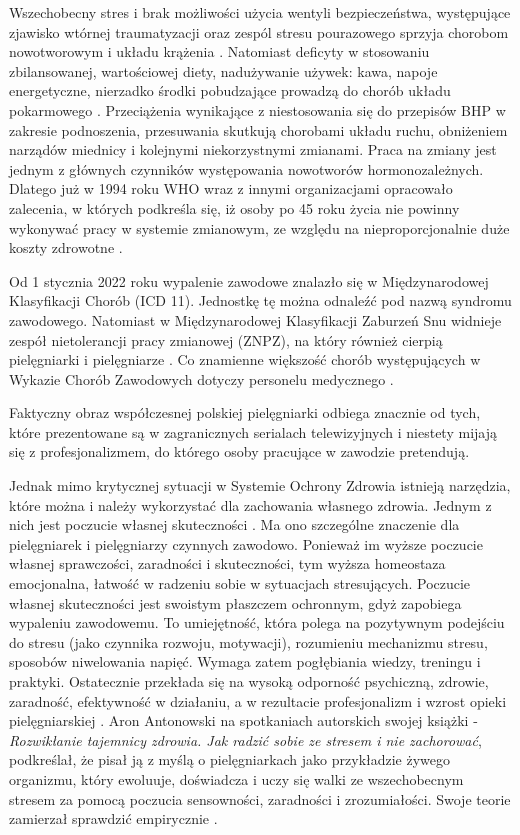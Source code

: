 \documentclass[a4paper,12pt,twoside,openright]{mwrep}
\begin{document}
Wszechobecny stres i brak możliwości użycia wentyli bezpieczeństwa, występujące zjawisko wtórnej traumatyzacji oraz zespól stresu pourazowego sprzyja chorobom nowotworowym i układu krążenia \cite{skutki}. Natomiast deficyty w stosowaniu zbilansowanej, wartościowej diety, nadużywanie używek: kawa, napoje energetyczne, nierzadko środki pobudzające prowadzą do chorób układu pokarmowego \cite{p.p}. Przeciążenia wynikające z niestosowania się do przepisów BHP w zakresie podnoszenia, przesuwania skutkują chorobami układu ruchu, obniżeniem narządów miednicy i kolejnymi niekorzystnymi zmianami. Praca na zmiany jest jednym z głównych czynników występowania nowotworów hormonozależnych. Dlatego już w 1994 roku WHO wraz z innymi organizacjami opracowało zalecenia, w których podkreśla się, iż osoby po 45 roku życia nie powinny wykonywać pracy w systemie zmianowym, ze względu na nieproporcjonalnie duże koszty zdrowotne  \cite{zalecenia}. 

Od 1 stycznia 2022 roku wypalenie zawodowe znalazło się w Międzynarodowej Klasyfikacji Chorób (ICD 11). Jednostkę tę można odnaleźć pod nazwą syndromu zawodowego. Natomiast w Międzynarodowej Klasyfikacji Zaburzeń Snu widnieje zespół nietolerancji pracy zmianowej (ZNPZ), na który również cierpią pielęgniarki i pielęgniarze \cite{znpz}. Co znamienne większość chorób występujących w Wykazie Chorób Zawodowych dotyczy personelu medycznego \cite{wykaz}. 


 Faktyczny obraz współczesnej polskiej pielęgniarki odbiega znacznie od tych, które prezentowane są w zagranicznych serialach telewizyjnych i niestety mijają się z profesjonalizmem, do którego osoby pracujące w zawodzie pretendują.

Jednak mimo krytycznej sytuacji w Systemie Ochrony Zdrowia istnieją narzędzia, które można i należy wykorzystać dla zachowania własnego zdrowia. Jednym z nich jest poczucie własnej skuteczności \cite{skutecznosc}. Ma ono szczególne znaczenie dla pielęgniarek i pielęgniarzy czynnych zawodowo. Ponieważ im wyższe poczucie własnej sprawczości, zaradności i skuteczności, tym wyższa homeostaza emocjonalna, łatwość w radzeniu sobie w sytuacjach stresujących. Poczucie własnej skuteczności jest swoistym płaszczem ochronnym, gdyż zapobiega wypaleniu zawodowemu. To umiejętność, która polega na pozytywnym podejściu do stresu (jako czynnika rozwoju, motywacji), rozumieniu mechanizmu stresu, sposobów niwelowania napięć. Wymaga zatem pogłębiania wiedzy, treningu i praktyki. Ostatecznie przekłada się na wysoką odporność psychiczną, zdrowie, zaradność, efektywność w działaniu, a w rezultacie profesjonalizm i wzrost opieki pielęgniarskiej \cite{stres}. Aron Antonowski  na spotkaniach autorskich  swojej książki - \textit {Rozwikłanie tajemnicy zdrowia. Jak radzić sobie ze stresem i nie zachorować}, podkreślał, że pisał ją z myślą o pielęgniarkach jako przykładzie żywego organizmu, który ewoluuje, doświadcza i uczy się walki ze wszechobecnym stresem za pomocą poczucia sensowności, zaradności i zrozumiałości. Swoje teorie zamierzał sprawdzić empirycznie \cite{aron}.
\end{document}

